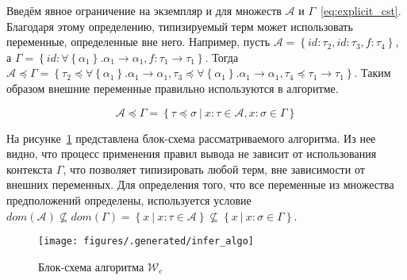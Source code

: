 Введём явное ограничение на экземпляр и для множеств $\mathcal{A}$ и $\Gamma$~\eqref{eq:explicit_cst}.
Благодаря этому определению, типизируемый терм может использовать переменные, определенные вне него.
Например, пусть $\mathcal{A} = \left\{ id: \tau_2, id: \tau_3, f: \tau_4 \right\}$, а $\Gamma = \left\{ id: \forall \left\{ \alpha_1 \right\}. \alpha_1 \to \alpha_1, f: \tau_1 \to \tau_1 \right\}$.
Тогда $\mathcal{A} \preceq \Gamma = \left\{ \tau_2 \preceq \forall \left\{ \alpha_1 \right\}. \alpha_1 \to \alpha_1, \tau_3 \preceq\forall \left\{ \alpha_1 \right\}. \alpha_1 \to \alpha_1, \tau_4 \preceq \tau_1 \to \tau_1 \right\}$.
Таким образом внешние переменные правильно используются в алгоритме.

\begin{equation}
    \label{eq:explicit_cst}
    \mathcal{A} \preceq \Gamma = \left\{ \tau \preceq \sigma ~|~ x: \tau \in \mathcal{A}, x: \sigma \in \Gamma \right\}
\end{equation}

На рисунке~\ref{fig:infer_algo} представлена блок-схема рассматриваемого алгоритма.
Из нее видно, что процесс применения правил вывода не зависит от использования контекста $\Gamma$, что позволяет типизировать любой терм, вне зависимости от внешних переменных.
Для определения того, что все переменные из множества предположений определены, используется условие $dom(\mathcal{A}) \nsubseteq dom(\Gamma) = \left\{ x ~|~ x: \tau \in \mathcal{A} \right\} \nsubseteq \left\{ x ~|~ x: \sigma \in \Gamma \right\}$.

\begin{figure}[h]
    \centering
    \texttt{[image: figures/.generated/infer\_algo]}
    \caption{Блок-схема алгоритма $\mathcal{W}_c$}
    \label{fig:infer_algo}
\end{figure}


